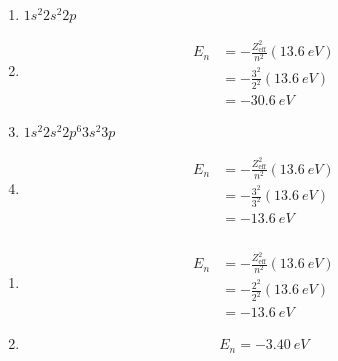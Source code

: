 \documentclass{article}
\begin{document}
\begin{enumerate}
  \item $1 s^2 2 s^2 2 p$

  \item

        \begin{align*}
          E_n & = -\frac{Z_\text{eff}^2}{n^2} (\qty{13.6}{eV}) \\
              & = -\frac{3^2}{2^2} (\qty{13.6}{eV})            \\
              & = \qty{-30.6}{eV}
        \end{align*}

  \item $1 s^2 2 s^2 2 p^6 3 s^2 3 p$

  \item

        \begin{align*}
          E_n & = -\frac{Z_\text{eff}^2}{n^2} (\qty{13.6}{eV}) \\
              & = -\frac{3^2}{3^2} (\qty{13.6}{eV})            \\
              & = \qty{-13.6}{eV}
        \end{align*}
\end{enumerate}

\setcounter{subsubsection}{34}
\subsubsection{}

\begin{enumerate}
  \item

        \begin{align*}
          E_n & = -\frac{Z_\text{eff}^2}{n^2} (\qty{13.6}{eV}) \\
              & = -\frac{2^2}{2^2} (\qty{13.6}{eV})            \\
              & = \qty{-13.6}{eV}
        \end{align*}

  \item \[E_n = \qty{-3.40}{eV}\]
\end{enumerate}

\setcounter{subsubsection}{36}
\subsubsection{}
\end{document}
